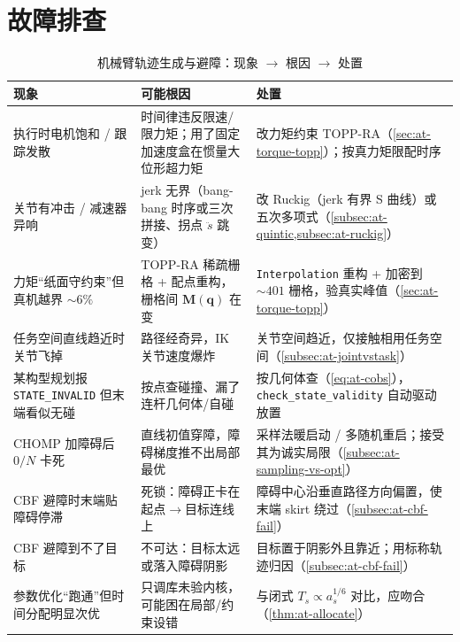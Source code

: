 \section*{故障排查}

\begin{table}[H]\centering\small
\caption{机械臂轨迹生成与避障：现象 $\to$ 根因 $\to$ 处置}
\label{tab:at-troubleshoot}
\begin{tabularx}{\linewidth}{p{} L L}
\toprule
现象 & 可能根因 & 处置 \\
\midrule
执行时电机饱和 / 跟踪发散 & 时间律违反限速/限力矩；用了固定加速度盒在惯量大位形超力矩 & 改力矩约束 TOPP-RA（\cref{sec:at-torque-topp}）；按真力矩限配时序 \\
关节有冲击 / 减速器异响 & jerk 无界（bang-bang 时序或三次拼接、拐点 $\ddot s$ 跳变） & 改 Ruckig（jerk 有界 S 曲线）或五次多项式（\cref{subsec:at-quintic,subsec:at-ruckig}） \\
力矩“纸面守约束”但真机越界 $\sim 6\%$ & TOPP-RA 稀疏栅格 + 配点重构，栅格间 $\mathbf{M}(\mathbf{q})$ 在变 & \texttt{Interpolation} 重构 + 加密到 $\sim 401$ 栅格，验真实峰值（\cref{sec:at-torque-topp}） \\
任务空间直线趋近时关节飞掉 & 路径经奇异，IK 关节速度爆炸 & 关节空间趋近，仅接触相用任务空间（\cref{subsec:at-jointvstask}） \\
某构型规划报 \texttt{STATE\_INVALID} 但末端看似无碰 & 按点查碰撞、漏了连杆几何体/自碰 & 按几何体查（\cref{eq:at-cobs}），\texttt{check\_state\_validity} 自动驱动放置 \\
CHOMP 加障碍后 $0/N$ 卡死 & 直线初值穿障，障碍梯度推不出局部最优 & 采样法暖启动 / 多随机重启；接受其为诚实局限（\cref{subsec:at-sampling-vs-opt}） \\
CBF 避障时末端贴障碍停滞 & 死锁：障碍正卡在起点$\to$目标连线上 & 障碍中心沿垂直路径方向偏置，使末端 skirt 绕过（\cref{subsec:at-cbf-fail}） \\
CBF 避障到不了目标 & 不可达：目标太远或落入障碍阴影 & 目标置于阴影外且靠近；用标称轨迹归因（\cref{subsec:at-cbf-fail}） \\
参数优化“跑通”但时间分配明显次优 & 只调库未验内核，可能困在局部/约束设错 & 与闭式 $T_s\propto a_s^{1/6}$ 对比，应吻合（\cref{thm:at-allocate}） \\
\bottomrule
\end{tabularx}
\end{table}
